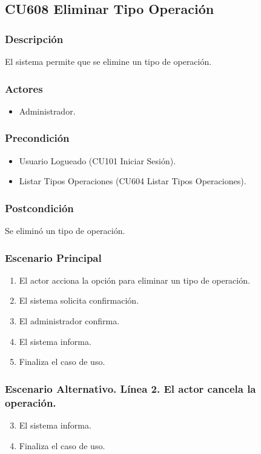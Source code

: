 \subsection{CU608 Eliminar Tipo Operaci\'{o}n}
\subsubsection{Descripci\'{o}n}
El sistema permite que se elimine un tipo de operaci\'{o}n.
\subsubsection{Actores}
\begin{itemize}
\item Administrador.
\end{itemize}
\subsubsection{Precondici\'{o}n}
\begin{itemize}
\item Usuario Logueado (CU101 Iniciar Sesi\'{o}n).
\item Listar Tipos Operaciones (CU604 Listar Tipos Operaciones).
\end{itemize}
\subsubsection{Postcondici\'{o}n}
Se elimin\'{o} un tipo de operaci\'{o}n.
\subsubsection{Escenario Principal}
\begin{enumerate}
\item El actor acciona la opci\'{o}n para eliminar un tipo de operaci\'{o}n.
\item El sistema solicita confirmaci\'{o}n.
\item El administrador confirma.
\item El sistema informa.
\item Finaliza el caso de uso.
\end{enumerate}
\subsubsection{Escenario Alternativo. L\'{i}nea 2. El actor cancela la operaci\'{o}n.}
\begin{enumerate}
\setcounter{enumi}{2}
\item El sistema informa.
\item Finaliza el caso de uso.
\end{enumerate}
